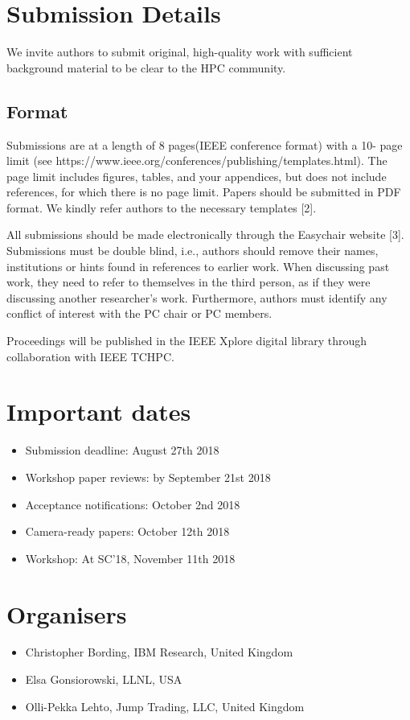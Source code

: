 \documentclass[11pt,a4paper]{article}
\begin{document}
\section{Submission Details}

We invite authors to submit original, high-quality work with
sufficient background material to be clear to the HPC
community. 
\subsection{Format}
Submissions are at a length of 8 pages(IEEE conference format) with a 10-
page limit (see https://www.ieee.org/conferences/publishing/templates.html). 
The page limit includes figures, tables, and your appendices, 
but does not include references, for which there is no page limit. 
Papers should be submitted in PDF format. We kindly refer authors to 
the necessary templates [2].

All submissions should be made electronically through the Easychair
website [3].  Submissions must be double blind, i.e., authors should
remove their names, institutions or hints found in references to
earlier work. When discussing past work, they need to refer to
themselves in the third person, as if they were discussing another
researcher's work. Furthermore, authors must identify any conflict of
interest with the PC chair or PC members.

Proceedings will be published in the IEEE Xplore digital
library through collaboration with IEEE TCHPC.

\section{Important dates}
\begin{itemize}
\item Submission deadline: August 27th 2018
\item Workshop paper reviews: by September 21st 2018
\item Acceptance notifications: October 2nd 2018
\item Camera-ready papers: October 12th 2018
\item Workshop: At SC'18, November 11th 2018
\end{itemize}

\section{Organisers}

\begin{itemize}
\item Christopher Bording, IBM Research, United Kingdom 
\item Elsa Gonsiorowski, LLNL, USA
\item Olli-Pekka Lehto, Jump Trading, LLC, United Kingdom
\end{itemize}
\end{document}
